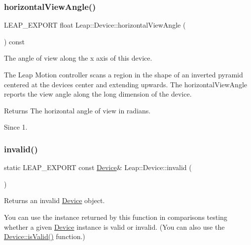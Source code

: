 \subsubsection{\texorpdfstring{horizontal\+View\+Angle()}{horizontalViewAngle()}}
{\footnotesize\ttfamily L\+E\+A\+P\+\_\+\+E\+X\+P\+O\+RT float Leap\+::\+Device\+::horizontal\+View\+Angle (\begin{DoxyParamCaption}{ }\end{DoxyParamCaption}) const}

The angle of view along the x axis of this device.



The Leap Motion controller scans a region in the shape of an inverted pyramid centered at the device\textquotesingle{}s center and extending upwards. The horizontal\+View\+Angle reports the view angle along the long dimension of the device.


\begin{DoxyCodeInclude}
\end{DoxyCodeInclude}


\begin{DoxyReturn}{Returns}
The horizontal angle of view in radians. 
\end{DoxyReturn}
\begin{DoxySince}{Since}
1. 
\end{DoxySince}
\mbox{\label{class_leap_1_1_device_a4a87905142db30a40b47b428db495db6}} 
\subsubsection{\texorpdfstring{invalid()}{invalid()}}
{\footnotesize\ttfamily static L\+E\+A\+P\+\_\+\+E\+X\+P\+O\+RT const \hyperlink{class_leap_1_1_device}{Device}\& Leap\+::\+Device\+::invalid (\begin{DoxyParamCaption}{ }\end{DoxyParamCaption})\hspace{0.3cm}{\ttfamily [static]}}

Returns an invalid \hyperlink{class_leap_1_1_device}{Device} object.

You can use the instance returned by this function in comparisons testing whether a given \hyperlink{class_leap_1_1_device}{Device} instance is valid or invalid. (You can also use the \hyperlink{class_leap_1_1_device_a3de3767cbfc2a4f24cefa99d363d15ea}{Device\+::is\+Valid()} function.)


